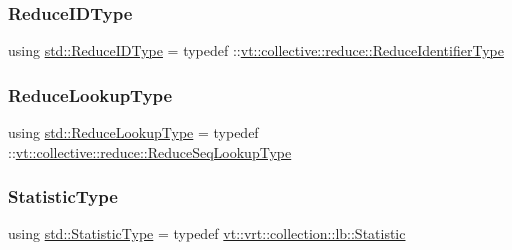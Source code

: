 \mbox{\label{namespacestd_a499b9bfc09049e7ac355a623c6e3c357}} 
\subsubsection{\texorpdfstring{Reduce\+I\+D\+Type}{ReduceIDType}}
{\footnotesize\ttfamily using \hyperlink{namespacestd_a499b9bfc09049e7ac355a623c6e3c357}{std\+::\+Reduce\+I\+D\+Type} = typedef \+::\hyperlink{namespacevt_1_1collective_1_1reduce_ad688d164ad18b2011198cbc97cc84b74}{vt\+::collective\+::reduce\+::\+Reduce\+Identifier\+Type}}

\mbox{\label{namespacestd_ac07dcbf55c02624fc69badeb378edb40}} 
\subsubsection{\texorpdfstring{Reduce\+Lookup\+Type}{ReduceLookupType}}
{\footnotesize\ttfamily using \hyperlink{namespacestd_ac07dcbf55c02624fc69badeb378edb40}{std\+::\+Reduce\+Lookup\+Type} = typedef \+::\hyperlink{namespacevt_1_1collective_1_1reduce_a3e69dddbbc89a0c9e9b986c5642efeba}{vt\+::collective\+::reduce\+::\+Reduce\+Seq\+Lookup\+Type}}

\mbox{\label{namespacestd_a77b0310083adc8639f9659f5c8b3cf0d}} 
\subsubsection{\texorpdfstring{Statistic\+Type}{StatisticType}}
{\footnotesize\ttfamily using \hyperlink{namespacevt_1_1vrt_1_1collection_1_1lb_af0e20ef9afee77295053aa83bf1348b1}{std\+::\+Statistic\+Type} = typedef \hyperlink{namespacevt_1_1vrt_1_1collection_1_1lb_af0e20ef9afee77295053aa83bf1348b1}{vt\+::vrt\+::collection\+::lb\+::\+Statistic}}

